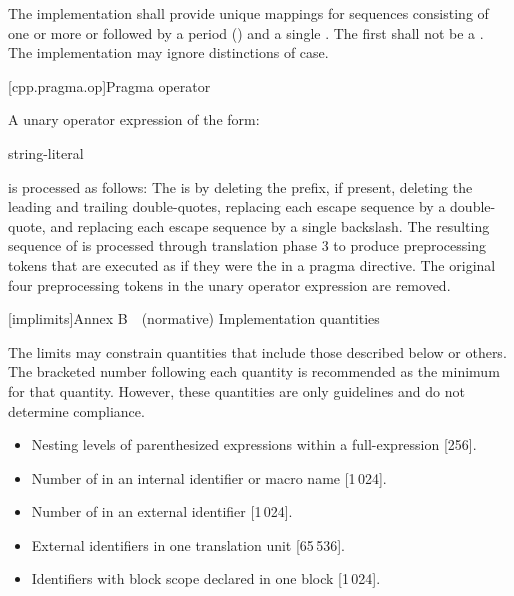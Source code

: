\documentclass{wg21}
\begin{document}
\pnum
The implementation shall provide unique mappings for
sequences consisting of one or more
 or 
followed by a period
()
and a single
.
The first  shall not be a .
The implementation may ignore distinctions of  case.



[cpp.pragma.op]{Pragma operator}%
%

\pnum
A unary operator expression of the form:
\begin{ncbnf}
     \terminal{(} string-literal \terminal{)}
\end{ncbnf}
is processed as follows: The  is 
by deleting the  prefix, if present, deleting the leading and trailing
double-quotes, replacing each escape sequence  by a double-quote, and
replacing each escape sequence \tcode{\textbackslash\textbackslash} by a single
backslash. The resulting sequence of  is processed through translation phase 3
to produce preprocessing tokens that are executed as if they were the
 in a pragma directive. The original four preprocessing
tokens in the unary operator expression are removed.

[implimits]{Annex B (normative) Implementation quantities}

\pnum
The limits may constrain quantities
that include those described below or others.
The bracketed number following each quantity is recommended
as the minimum for that quantity.
However, these quantities are only guidelines and do not determine compliance.
\begin{itemize}
    \item%
    Nesting levels of parenthesized expressions within a full-expression [256].
    \item%
    Number of
     in an internal identifier
    or macro name [1\,024].
    \item%
    Number of
     in an external identifier [1\,024].
    \item%
    External identifiers in one translation unit [65\,536].
    \item%
    Identifiers with block scope declared in one block [1\,024].
\end{itemize}
\end{document}
